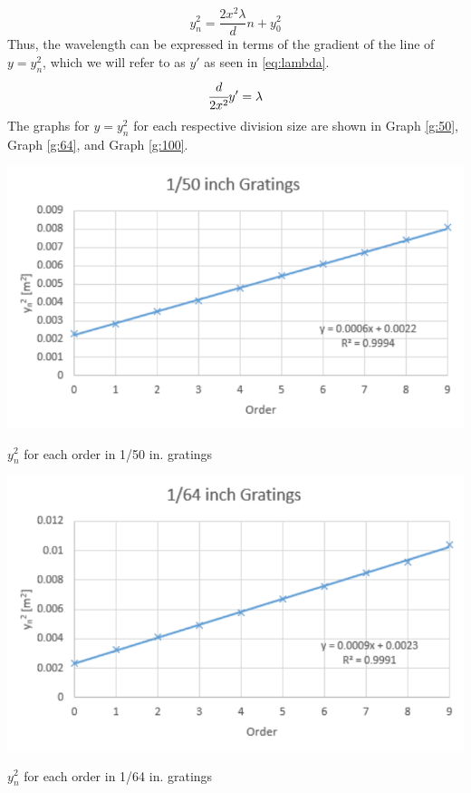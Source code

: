 \documentclass{article}
\begin{document}
\begin{equation}\label{eq:ysq}
  y_{n}^{2} = \frac{2x^2 \lambda}{d} n + y_{0}^{2}
\end{equation}
Thus, the wavelength can be expressed in terms of the gradient of the line of $y = y_{n}^{2}$, which we will refer to as $y'$ as seen in \eqref{eq:lambda}.
\begin{equation}\label{eq:lambda}
  \cfrac{
  d
  }{
  2x^2
  }y' = \lambda
\end{equation}
The graphs for $y = y_{n}^{2}$ for each respective division size are shown in Graph \ref{g:50}, Graph \ref{g:64}, and Graph \ref{g:100}.

\begin{graph}
  \includegraphics[width=\textwidth]{img/50.pdf}
  \caption{$y_{n}^{2}$ for each order in 1/50 in. gratings}
  \label{g:50}
\end{graph}

\begin{graph}
  \includegraphics[width=\textwidth]{img/64.pdf}
  \caption{$y_{n}^{2}$ for each order in 1/64 in. gratings}
  \label{g:64}
\end{graph}
\end{document}
